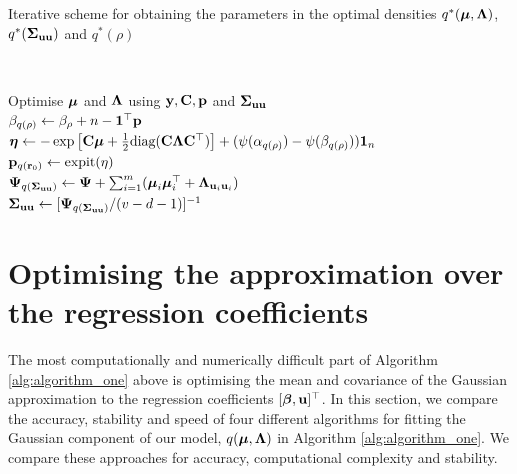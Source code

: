 \bigskip 
\begin{algorithm}
	\caption[Algorithm 1]{Iterative scheme for obtaining the parameters in the
		optimal densities $q^*({\boldsymbol \mu}, {\boldsymbol \Lambda})$, $q^*({\boldsymbol \Sigma}_{{\bf u} {\bf u}})$ and $q^*(\rho)$}
	\label{alg:algorithm_one}
	\begin{algorithmic}
		
		\medskip 
		 \\[2ex]
		
			\medskip 
			\STATE Optimise ${\boldsymbol \mu}$ and ${\boldsymbol \Lambda}$ using ${\bf y}, {\bf C}, {\bf p}$ and ${\boldsymbol \Sigma}_{{\bf u} {\bf u}}$ \\[2ex]
			\STATE $\beta_{q(\rho)} \leftarrow \beta_\rho + n - {\bf 1}^\top{\bf p}$ \\[2ex]
            \STATE ${\boldsymbol \eta} \leftarrow -\exp \left [ {\bf C} {\boldsymbol \mu} + \frac{1}{2} \text{diag}{({\bf C}{\boldsymbol\Lambda}{\bf C}^\top)} \right ] + (\psi{(\alpha_{q{(\rho)}})} - \psi{(\beta_{q{(\rho)}})}) {\bf 1}_n$ \\[2ex]
			\STATE ${\bf p}_{q({\bf r}_0)} \leftarrow \text{expit}{(\eta)}$ \\[1ex]
			\STATE ${\boldsymbol \Psi}_{q({\boldsymbol \Sigma}_{{\bf u} {\bf u}})} \leftarrow {\boldsymbol\Psi} + \sum_{i=1}^m ({\boldsymbol \mu}_i {\boldsymbol \mu}_i^\top + {\boldsymbol \Lambda}_{{{\bf u}}_i {{\bf u}}_i})$ \\[2ex]
            \STATE ${\boldsymbol \Sigma}_{{\bf u}{\bf u}} \leftarrow [{\boldsymbol \Psi}_{q({\boldsymbol \Sigma}_{{\bf u} {\bf u}})}/(v - d - 1)]^{-1}$
            
            \medskip 
		\ENDWHILE
	\end{algorithmic}
\end{algorithm}
						
\section{Optimising the approximation over the regression coefficients}
\label{sec:gaussian}

The most computationally and numerically difficult part of Algorithm
\ref{alg:algorithm_one} above is optimising the mean and covariance of the
Gaussian approximation to the regression coefficients $[{\boldsymbol \beta}, {\bf u}]^\top$. In
this section, we compare the accuracy, stability and speed of four different
algorithms for fitting the Gaussian component of our model, $q({\boldsymbol \mu}, {\boldsymbol \Lambda})$
in Algorithm \ref{alg:algorithm_one}.  We compare these approaches for
accuracy, computational complexity and stability.

